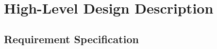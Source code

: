 \documentclass[12pt,a4paper,titlepage,oneside]{article}
\begin{document}
\MakeTitleAndTOC
  \newpage


\section{High-Level Design Description}

\subsection{Requirement Specification}
\end{document}
